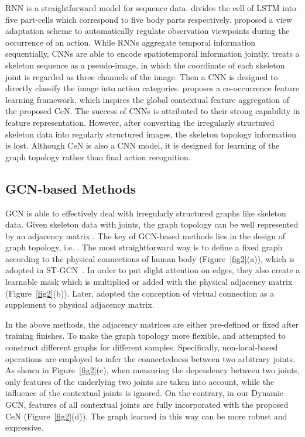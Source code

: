 \documentclass[sigconf]{acmart}
\begin{document}
RNN is a straightforward model for sequence data. \cite{shahroudy} divides the cell of LSTM into five part-cells which correspond to five body parts respectively. \cite{zhang2017view} proposed a view adaptation scheme to automatically regulate observation viewpoints during the occurrence of an action. While RNNs aggregate temporal information sequentially, CNNs are able to encode spatiotemporal information jointly. \cite{li2017skeleton} treats a skeleton sequence as a pseudo-image, in which the coordinate of each skeleton joint  is regarded as three channels of the image. Then a CNN is designed to directly classify the image into action categories. \cite{lili} proposes a co-occurrence feature learning framework, which inspires the global contextual feature aggregation of the proposed CeN. The success of CNNs is attributed to their strong capability in feature representation. However, after converting the irregularly structured skeleton data into regularly structured images, the skeleton topology information is lost. Although CeN is also a CNN model, it is designed for learning of the graph topology rather than final action recognition.

\subsection{GCN-based Methods}
GCN is able to effectively deal with irregularly structured graphs like skeleton data. Given skeleton data with  joints, the graph topology can be well represented by an  adjacency matrix . The key of GCN-based methods lies in the design of graph topology, i.e. . The most straightforward way is to define a fixed graph according to the physical connections of human body (Figure~\ref{fig2}(a)), which is adopted in ST-GCN~\cite{yanspatial}. In order to put slight attention on edges, they also create a learnable mask which is multiplied or added with the physical adjacency matrix (Figure~\ref{fig2}(b)). Later, \cite{tang2018deep} adopted the conception of virtual connection as a supplement to physical adjacency matrix.

In the above methods, the adjacency matrices are either pre-defined or fixed after training finishes. To make the graph topology more flexible, \cite{shi2019two,liu2020} and \cite{li2019spatio} attempted to construct different graphs for different samples. Specifically, non-local-based operations are employed to infer the connectedness between two arbitrary joints. As shown in Figure~\ref{fig2}(c), when measuring the dependency between two joints, only features of the underlying two joints are taken into account, while the influence of the contextual joints is ignored. On the contrary, in our Dynamic GCN, features of all contextual joints are fully incorporated with the proposed CeN (Figure~\ref{fig2}(d)). The graph learned in this way can be more robust and expressive.
\end{document}
